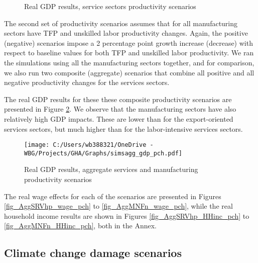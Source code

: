 \documentclass[11pt,english]{article}
\begin{document}
\begin{figure}[ht!]\caption{Real GDP results, service sectors productivity scenarios} \label{fig_sims_pdy_gdp_pch}
	\centering
\setlength\fboxsep{0pt}
\setlength\fboxrule{0.5pt}
\end{figure}
\clearpage

The second set of productivity scenarios assumes that for all manufacturing sectors have TFP and unskilled labor productivity changes. Again, the positive (negative) scenarios impose a 2 percentage point growth increase (decrease) with respect to baseline values for both TFP and unskilled labor productivity. We ran the simulations using all the manufacturing sectors together, and for comparison, we also run two composite (aggregate) scenarios that combine all positive and all negative productivity changes for the services sectors. 

The real GDP results for these these composite productivity scenarios are presented in Figure \ref{fig_simsagg_gdp_pch}. We observe that the manufacturing sectors have also relatively high GDP impacts. These are lower than for the export-oriented services sectors, but much higher than for the labor-intensive services sectors.

\begin{figure}[ht!]\caption{Real GDP results, aggregate services and manufacturing productivity scenarios}  \label{fig_simsagg_gdp_pch}
	\centering
	\texttt{[image: C:/Users/wb388321/OneDrive - WBG/Projects/GHA/Graphs/simsagg\_gdp\_pch.pdf]}
\end{figure}


The real wage effects for each of the scenarios are presented in Figures \ref{fig_AggSRVhp_wage_pch} to \ref{fig_AggMNFn_wage_pch}, while the real household income results are shown in Figures \ref{fig_AggSRVhp_HHinc_pch} to \ref{fig_AggMNFn_HHinc_pch}, both in the Annex.

\clearpage
\subsection{Climate change damage scenarios}
\end{document}
